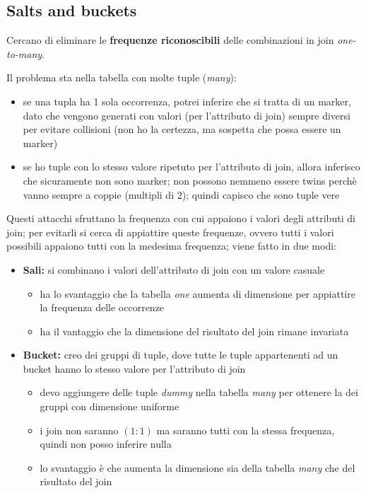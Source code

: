 \documentclass{report}
\begin{document}
\subsection{Salts and buckets}

Cercano di eliminare le \textbf{frequenze riconoscibili} delle combinazioni in 
join \textit{one-to-many}. 

\noindent Il problema sta nella tabella con molte tuple (\textit{many}):
\begin{itemize}
    \item se una tupla ha 1 sola occorrenza, potrei inferire che si tratta di un marker, dato che vengono 
    generati con valori (per l'attributo di join) sempre diversi per evitare collisioni (non ho la certezza, ma 
    sospetta che possa essere un marker)
    \item se ho tuple con lo stesso valore ripetuto per l'attributo di join, allora inferisco che sicuramente non 
    sono marker; non possono nemmeno essere twins perchè vanno sempre a coppie (multipli di 2); quindi capisco che sono tuple vere
\end{itemize}


\noindent Questi attacchi sfruttano la frequenza con cui appaiono i valori degli attributi di join; 
per evitarli si cerca di appiattire queste frequenze, ovvero tutti i valori possibili appaiono tutti con la medesima 
frequenza; viene fatto in due modi:
\begin{itemize}
    \item \textbf{Sali:} si combinano i valori dell'attributo di join con un valore casuale
    \begin{itemize}
        \item ha lo svantaggio che la tabella \textit{one} aumenta di dimensione per appiattire la frequenza delle occorrenze
        \item ha il vantaggio che la dimensione del risultato del join rimane invariata
    \end{itemize}
    \item \textbf{Bucket:} creo dei gruppi di tuple, dove tutte le tuple appartenenti ad un bucket 
    hanno lo stesso valore per l'attributo di join
    \begin{itemize}
        \item devo aggiungere delle tuple \textit{dummy} nella tabella \textit{many} per ottenere 
        la dei gruppi con dimensione uniforme 
        \item i join non saranno $(1:1)$ ma saranno tutti con la stessa frequenza, quindi non posso inferire nulla 
        \item lo svantaggio è che aumenta la dimensione sia della tabella \textit{many} che del risultato del join 
    \end{itemize}
\end{itemize}
\end{document}
